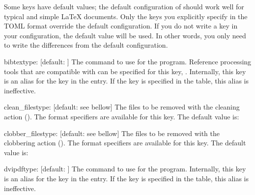 \documentclass[draft]{llmk-doc}
\begin{document}
Some keys have default values; the default configuration of  should
work well for typical and simple {\LaTeX} documents. Only the keys you
explicitly specify in the TOML format override the default configuration. If
you do not write a key in your configuration, the default value will be used.
In other words, you only need to write the differences from the default
configuration.

\begin{confkey}{bibtex}{type: }[default: ]
The command to use for the  program. Reference processing
tools that are compatible with {\BibTeX} can be specified for this key, \eg
{}. Internally, this key is an alias for the  key in
the  entry. If the  key is specified in the
 table, this alias is ineffective.
\end{confkey}

\begin{confkey}{clean\_files}{type: }
  [default: see bellow]
The files to be removed with the cleaning action (). The format
specifiers are available for this key. The default value is:
%
\begin{htcode}
[
  "%
  "%
  "%
]
\end{htcode}
\end{confkey}

\begin{confkey}{clobber\_files}{type: }
  [default: see bellow]
The files to be removed with the clobbering action (). The format
specifiers are available for this key. The default value is:
%
\end{confkey}

\begin{confkey}{dvipdf}{type: }[default: ]
The command to use for the  program. Internally, this key is
an alias for the  key in the  entry. If the
 key is specified in the  table, this alias is
ineffective.
\end{confkey}
\end{document}

